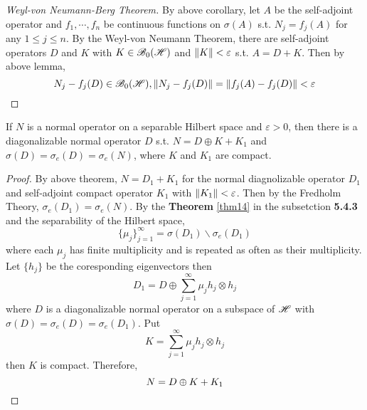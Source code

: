\begin{proof}[Weyl-von Neumann-Berg Theorem]
	By above corollary, let $A$ be the self-adjoint operator and $f_1,\cdots,f_n$ be continuous functions on $\sigma(A)$ s.t. $N_j = f_j(A)$ for any $1 \leqslant j \leqslant n$. By the Weyl-von Neumann Theorem, there are self-adjoint operators $D$ and $K$ with $K \in \mathscr{B}_{0}\mathscr{(H)}$ and $\left\lVert K\right\lVert < \varepsilon$ s.t. $A = D + K$. Then by above lemma,
	\begin{equation*}
		N_j - f_j(D) \in \mathscr{B}_{0}\mathscr{(H)}, \left\lVert N_j - f_j(D)\right\lVert = \left\lVert f_j(A) - f_j(D)\right\lVert < \varepsilon \qedhere
	\end{equation*}
\end{proof}

\begin{cor}
	If $N$ is a normal operator on a separable Hilbert space and $\varepsilon > 0$, then there is a diagonalizable normal operator $D$ s.t. $N = D \oplus K + K_1 $ and $\sigma(D) = \sigma_e(D) = \sigma_e(N)$, where $K$ and $K_1$ are compact.
\end{cor}
\begin{proof}
	By above theorem, $N = D_1 + K_1$ for the normal diagnolizable operator $D_1$ and self-adjoint compact operator $K_1$ with $\left\lVert K_1\right\lVert < \varepsilon$. Then by the Fredholm Theory, $\sigma_e(D_1) = \sigma_e(N)$. By the \textbf{Theorem} \ref{thm14} in the subsetction \textbf{5.4.3} and the separability of the Hilbert space, 
	\begin{equation*}
		\{\mu_j\}_{j=1}^{\infty} = \sigma(D_1) \backslash \sigma_e(D_1)
	\end{equation*}
	where each $\mu_j$ has finite multiplicity and is repeated as often as their multiplicity. Let $\{h_j\}$ be the coresponding eigenvectors then
	\begin{equation*}
		D_1 = D \oplus \sum_{j=1}^{\infty} \mu_j h_j \otimes h_j
	\end{equation*}
	where $D$ is a diagonalizable normal operator on a subspace of $\mathscr{H}$ with $\sigma(D) = \sigma_e(D) = \sigma_e(D_1)$. Put 
	\begin{equation*}
		K = \sum_{j=1}^{\infty} \mu_j h_j \otimes h_j
	\end{equation*}
	then $K$ is compact. Therefore,
	\begin{equation*}
		N = D \oplus K + K_1 \qedhere
	\end{equation*}	
\end{proof}

